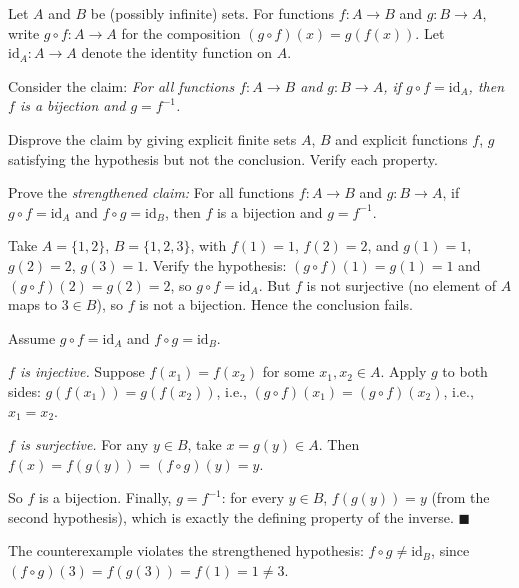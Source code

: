 \documentclass[test,letterpaper]{cs20}
\begin{document}
\begin{problem}

Let $A$ and $B$ be (possibly infinite) sets. For functions $f: A \to B$ and $g: B \to A$, write $g \circ f: A \to A$ for the composition $(g \circ f)(x) = g(f(x))$. Let $\mathrm{id}_A: A \to A$ denote the identity function on $A$.

Consider the claim: \emph{For all functions $f: A \to B$ and $g: B \to A$, if $g \circ f = \mathrm{id}_A$, then $f$ is a bijection and $g = f^{-1}$.}

\subproblem Disprove the claim by giving explicit finite sets $A$, $B$ and explicit functions $f$, $g$ satisfying the hypothesis but not the conclusion. Verify each property.

\subproblem Prove the \emph{strengthened claim:} For all functions $f: A \to B$ and $g: B \to A$, if $g \circ f = \mathrm{id}_A$ and $f \circ g = \mathrm{id}_B$, then $f$ is a bijection and $g = f^{-1}$.

\begin{solution}
\subsolution Take $A = \{1, 2\}$, $B = \{1, 2, 3\}$, with $f(1) = 1$, $f(2) = 2$, and $g(1) = 1$, $g(2) = 2$, $g(3) = 1$. Verify the hypothesis: $(g \circ f)(1) = g(1) = 1$ and $(g \circ f)(2) = g(2) = 2$, so $g \circ f = \mathrm{id}_A$. But $f$ is not surjective (no element of $A$ maps to $3 \in B$), so $f$ is not a bijection. Hence the conclusion fails.

\subsolution Assume $g \circ f = \mathrm{id}_A$ and $f \circ g = \mathrm{id}_B$.

\emph{$f$ is injective.} Suppose $f(x_1) = f(x_2)$ for some $x_1, x_2 \in A$. Apply $g$ to both sides: $g(f(x_1)) = g(f(x_2))$, i.e., $(g \circ f)(x_1) = (g \circ f)(x_2)$, i.e., $x_1 = x_2$.

\emph{$f$ is surjective.} For any $y \in B$, take $x = g(y) \in A$. Then $f(x) = f(g(y)) = (f \circ g)(y) = y$.

So $f$ is a bijection. Finally, $g = f^{-1}$: for every $y \in B$, $f(g(y)) = y$ (from the second hypothesis), which is exactly the defining property of the inverse. $\blacksquare$

The counterexample violates the strengthened hypothesis: $f \circ g \neq \mathrm{id}_B$, since $(f \circ g)(3) = f(g(3)) = f(1) = 1 \neq 3$.
\end{solution}

\pagebreak

\end{problem}
\end{document}
